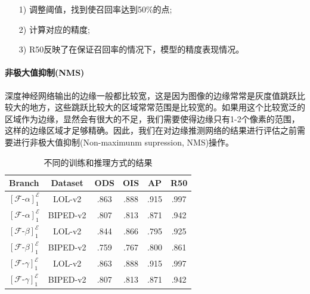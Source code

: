 \documentclass[a4paper]{ctexart}
\begin{document}
	\begin{itemize}
		\item[1)]
		调整阈值，找到使召回率达到50\%的点;
		\item[2)]
		计算对应的精度;
		\item[3)]
		R50反映了在保证召回率的情况下，模型的精度表现情况。
	\end{itemize}
	
	\paragraph{非极大值抑制(NMS)}
	
	深度神经网络输出的边缘一般都比较宽，这是因为图像的边缘常常是灰度值跳跃比较大的地方，这些跳跃比较大的区域常常范围是比较宽的。如果用这个比较宽泛的区域作为边缘，显然会有很大的不足，我们需要使得边缘只有1-2个像素的范围，这样的边缘区域才足够精确。因此，我们在对边缘推测网络的结果进行评估之前需要进行非极大值抑制(Non-maximunm supression, NMS)操作。
	
	
	
	\begin{table}[!htbp]
		\centering
		\small
			\begin{tabular}{>{\centering\arraybackslash}m{1.5cm} c c c c c}
				
				\hline
				
				\textbf{Branch} & \textbf{Dataset} & \textbf{ODS} & \textbf{OIS} & \textbf{AP} & \textbf{R50}  \\
				
				\hline
				
				${\left[\mathcal{F}\text{-}\alpha\right]}^{\mathcal{E}}_1$ & LOL-v2  & .863 & .888 & .915 & .997 \\
				
				${\left[\mathcal{F}\text{-}\alpha\right]}^{\mathcal{E}}_1$ & BIPED-v2& .807 & .813 & .871 & .942 \\
				
				${\left[\mathcal{F}\text{-}\beta\right]}^{\mathcal{E}}_1$  & LOL-v2  & .844 & .866 & .795 & .925 \\
				
				${\left[\mathcal{F}\text{-}\beta\right]}^{\mathcal{E}}_1$  & BIPED-v2& .759 & .767 & .800 & .861 \\
				
				${\left[\mathcal{F}\text{-}\gamma\right]}^{\mathcal{E}}_1$ & LOL-v2  & .863 & .888 & .915 & .997 \\
				
				${\left[\mathcal{F}\text{-}\gamma\right]}^{\mathcal{E}}_1$ & BIPED-v2& .807 & .813 & .871 & .942 \\
				
				\hline
				
			\end{tabular}
		\caption{
			\label{tab: Result}
			不同的训练和推理方式的结果} %
		
	\end{table}
	
\end{document}
